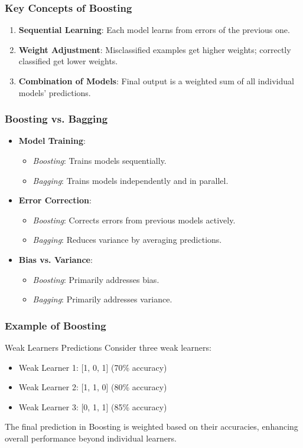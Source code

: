 \documentclass[aspectratio=169]{beamer}
\begin{document}
\begin{frame}[fragile]
  \frametitle{Key Concepts of Boosting}

  \begin{enumerate}
    \item \textbf{Sequential Learning}: Each model learns from errors of the previous one.
    \item \textbf{Weight Adjustment}: Misclassified examples get higher weights; correctly classified get lower weights.
    \item \textbf{Combination of Models}: Final output is a weighted sum of all individual models’ predictions.
  \end{enumerate}
\end{frame}

\begin{frame}[fragile]
  \frametitle{Boosting vs. Bagging}

  \begin{itemize}
    \item \textbf{Model Training}:
      \begin{itemize}
        \item \textit{Boosting}: Trains models sequentially.
        \item \textit{Bagging}: Trains models independently and in parallel.
      \end{itemize}
    \item \textbf{Error Correction}:
      \begin{itemize}
        \item \textit{Boosting}: Corrects errors from previous models actively.
        \item \textit{Bagging}: Reduces variance by averaging predictions.
      \end{itemize}
    \item \textbf{Bias vs. Variance}:
      \begin{itemize}
        \item \textit{Boosting}: Primarily addresses bias.
        \item \textit{Bagging}: Primarily addresses variance.
      \end{itemize}
  \end{itemize}
\end{frame}

\begin{frame}[fragile]
  \frametitle{Example of Boosting}

  \begin{block}{Weak Learners Predictions}
    Consider three weak learners:
    \begin{itemize}
      \item Weak Learner 1: [1, 0, 1] (70\% accuracy)
      \item Weak Learner 2: [1, 1, 0] (80\% accuracy)
      \item Weak Learner 3: [0, 1, 1] (85\% accuracy)
    \end{itemize}
  \end{block}
  
  The final prediction in Boosting is weighted based on their accuracies, enhancing overall performance beyond individual learners.
\end{frame}
\end{document}
